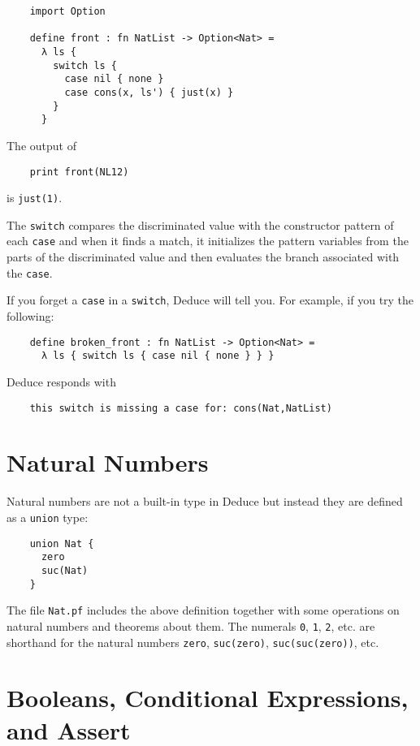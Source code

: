 \documentclass[12pt]{article}
\begin{document}
\begin{verbatim}
    import Option

    define front : fn NatList -> Option<Nat> =
      λ ls { 
        switch ls {
          case nil { none }
          case cons(x, ls') { just(x) }
        }
      }
\end{verbatim}
\noindent The output of 
\begin{verbatim}
    print front(NL12)
\end{verbatim}
\noindent is \texttt{just(1)}.

The \texttt{switch} compares the discriminated value with the
constructor pattern of each \texttt{case} and when it finds a match,
it initializes the pattern variables from the parts of the
discriminated value and then evaluates the branch associated with the
\texttt{case}.

If you forget a \texttt{case} in a \texttt{switch}, Deduce will tell
you. For example, if you try the following:
\begin{verbatim}
    define broken_front : fn NatList -> Option<Nat> =
      λ ls { switch ls { case nil { none } } }
\end{verbatim}
\noindent Deduce responds with
\begin{verbatim}
    this switch is missing a case for: cons(Nat,NatList)
\end{verbatim}


\section{Natural Numbers}

Natural numbers are not a built-in type in Deduce but instead they are
defined as a \texttt{union} type:

\begin{verbatim}
    union Nat {
      zero
      suc(Nat)
    }
\end{verbatim}

The file \texttt{Nat.pf} includes the above definition together with
some operations on natural numbers and theorems about them.  The
numerals \texttt{0}, \texttt{1}, \texttt{2}, etc. are shorthand for
the natural numbers \texttt{zero}, \texttt{suc(zero)},
\texttt{suc(suc(zero))}, etc.

\section{Booleans, Conditional Expressions, and Assert}
\end{document}

